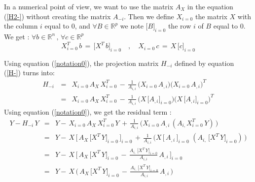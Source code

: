 In a numerical point of view, we want to use the matrix $A_X$ in the equation (\ref{H2-}) without creating the matrix $A_{-i }$.
Then we define $X_{i=0}$ the matrix $X$ with the column $i$ equal to $0$, and $\forall B \in \mathbb{R}^p$ we note $\big[B\big]_{i=0}$ the row $i$ of $B$ equal to $0$.
We get : $\forall b \in \mathbb{R}^n\,,\, \forall c \in \mathbb{R}^p $
 \begin{equation}
\label{notation0}
X_{i=0}^T\,b \,=\,\big[X^T\,b\big]_{i=0} \quad,\quad X_{i=0}\,c \,=\,X\,\big[c\big]_{i=0}
 \end{equation}


 Using equation (\ref{notation0}), the projection matrix $H_{-i}$ defined by equation (\ref{H-}) turns into:
 \begin{eqnarray}
H_{-i}\, & = & X_{i=0}\,A_X\,X_{i=0}^T \,-\,\frac {1}{A_{i,i}}\,  \big(X_{i=0}\,A_{,i}\big) \big(X_{i=0}\,A_{,i}\big)^T   \\
& = & X_{i=0}\,A_X\,X_{i=0}^T \,-\,\frac {1}{A_{i,i}}\,  \big(X\,\big[A_{,i}\big]_{i=0}  \big) \big(X\,\big[A_{,i}\big]_{i=0} \big)^T
\end{eqnarray}
 Using equation (\ref{notation0}), we get the residual term :
 \begin{eqnarray}
Y-H_{-i}\,Y & = &Y- \,X_{i=0}\,A_X\,X_{i=0}^T\,Y \,+\,\frac {1}{A_{i,i}}\,  \big(X_{i=0}\,A_{,i}\,(A_{i,} X_{i=0}^T\,Y)\,\big)   \\
 & = & Y-\,X\,\big[\,A_X\,\big[X^T\,Y\big]_{i=0}\,\big]_{i=0} \,+\,\frac {1}{A_{i,i}}\,  \big( X\,\big[\,A_{,i}\,\big]_{i=0}\,\,(A_{i,} \,\big[X^T\,Y\big]_{i=0})\,\big)   \\
 & = & Y-\,X\,\big[\,A_X\,\big[X^T\,Y\big]_{i=0}\, -\,\frac {A_{i,} \,\big[X^T\,Y\big]_{i=0}}{A_{i,i}}\,A_{,i}\,      \big]_{i=0} \\
\label{defH-Y}
 & = & Y- \,X\,\big(\,A_X\,\big[X^T\,Y\big]_{i=0}\, -\,\frac {A_{i,} \,\big[X^T\,Y\big]_{i=0}}{A_{i,i}}\,A_{,i}\,\big)
\end{eqnarray}


